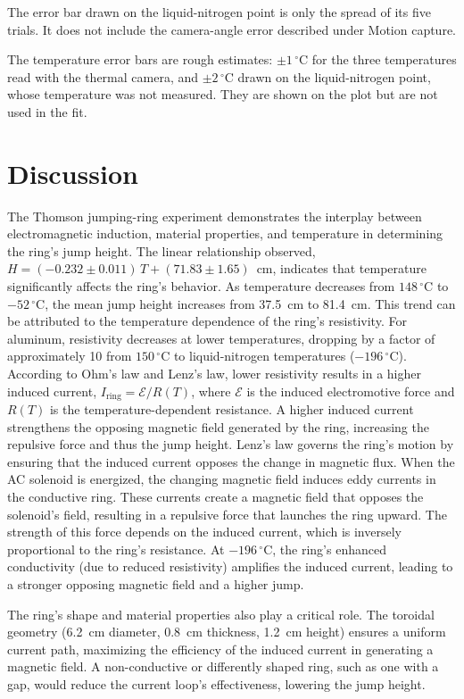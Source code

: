 \documentclass[11pt]{article}
\newcommand{\tC}[1]{$#1\,^{\circ}\mathrm{C}$}
\begin{document}
The error bar drawn on the liquid-nitrogen point is only the spread of its five trials. It does not
include the camera-angle error described under Motion capture.

The temperature error bars are rough estimates: $\pm 1\,^{\circ}$C for the three temperatures read
with the thermal camera, and $\pm 2\,^{\circ}$C drawn on the liquid-nitrogen point, whose
temperature was not measured. They are shown on the plot but are not used in the fit.

\section*{Discussion}

The Thomson jumping-ring experiment demonstrates the interplay between electromagnetic induction,
material properties, and temperature in determining the ring's jump height. The linear relationship
observed, $H = (-0.232 \pm 0.011)\,T + (71.83 \pm 1.65)$~cm, indicates that temperature
significantly affects the ring's behavior. As temperature decreases from \tC{148} to \tC{-52}, the
mean jump height increases from 37.5~cm to 81.4~cm. This trend can be attributed to the temperature
dependence of the ring's resistivity. For aluminum, resistivity decreases at lower temperatures,
dropping by a factor of approximately 10 from \tC{150} to liquid-nitrogen temperatures (\tC{-196}).
According to Ohm's law and Lenz's law, lower resistivity results in a higher induced current,
$I_\mathrm{ring} = \mathcal{E}/R(T)$, where $\mathcal{E}$ is the induced electromotive force and
$R(T)$ is the temperature-dependent resistance. A higher induced current strengthens the opposing
magnetic field generated by the ring, increasing the repulsive force and thus the jump height.
Lenz's law governs the ring's motion by ensuring that the induced current opposes the change in
magnetic flux. When the AC solenoid is energized, the changing magnetic field induces eddy currents
in the conductive ring. These currents create a magnetic field that opposes the solenoid's field,
resulting in a repulsive force that launches the ring upward. The strength of this force depends on
the induced current, which is inversely proportional to the ring's resistance. At \tC{-196}, the
ring's enhanced conductivity (due to reduced resistivity) amplifies the induced current, leading to
a stronger opposing magnetic field and a higher jump.

The ring's shape and material properties also play a critical role. The toroidal geometry (6.2~cm
diameter, 0.8~cm thickness, 1.2~cm height) ensures a uniform current path, maximizing the
efficiency of the induced current in generating a magnetic field. A non-conductive or differently
shaped ring, such as one with a gap, would reduce the current loop's effectiveness, lowering the
jump height.
\end{document}
